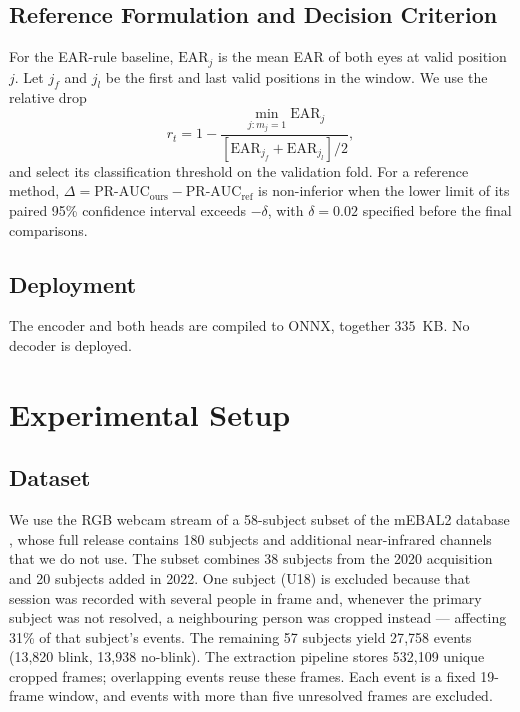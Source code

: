 \documentclass{IEEE_lsens}
\begin{document}
\subsection{Reference Formulation and Decision Criterion}
For the EAR-rule baseline, $\mathrm{EAR}_j$ is the mean EAR of both eyes
at valid position $j$. Let $j_f$ and $j_l$ be the first and last valid
positions in the window. We use the relative drop
\begin{equation}
r_t=1-\frac{\min_{j:m_j=1}\mathrm{EAR}_j}
{[\mathrm{EAR}_{j_f}+\mathrm{EAR}_{j_l}]/2},
\label{eq:earrule}
\end{equation}
and select its classification threshold on the validation fold. For a
reference method, $\Delta=\mathrm{PR\mbox{-}AUC}_{\mathrm{ours}}-
\mathrm{PR\mbox{-}AUC}_{\mathrm{ref}}$ is non-inferior when the lower
limit of its paired 95\% confidence interval exceeds $-\delta$, with
$\delta=0.02$ specified before the final comparisons.

\subsection{Deployment}
The encoder and both heads are compiled to ONNX, together $335$~KB. No
decoder is deployed.

\section{Experimental Setup}

\subsection{Dataset}
We use the RGB webcam stream of a 58-subject subset of the mEBAL2
database \cite{daza2024}, whose full release contains 180 subjects and
additional near-infrared channels that we do not use. The subset
combines 38 subjects from the 2020 acquisition and 20 subjects added in
2022. One subject (U18) is excluded because that session was recorded
with several people in frame and, whenever the primary subject was not
resolved, a neighbouring person was cropped instead --- affecting 31\%
of that subject's events. The remaining 57 subjects yield 27{,}758
events (13{,}820 blink, 13{,}938 no-blink). The extraction pipeline
stores 532{,}109 unique cropped frames; overlapping events reuse these
frames. Each event is a fixed 19-frame window, and events with more than
five unresolved frames are excluded.
\end{document}
